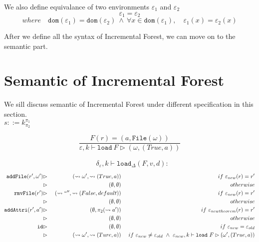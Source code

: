 \documentclass[10pt,twoside,a4paper]{article}
\theoremstyle{theorem}
\theoremstyle{lemma}
\theoremstyle{property}
\theoremstyle{definition}
\theoremstyle{assumption}
\def\snd{\pi_2}
\begin{document}
We also define equivalance of two environments $\varepsilon_1$ and $\varepsilon_2$
\begin{displaymath}
	\varepsilon_1 = \varepsilon_2
\end{displaymath}
\begin{displaymath}
	where \quad \mathtt{dom}(\varepsilon_1) = \mathtt{dom}(\varepsilon_2) ~\wedge~ \forall x \in \mathtt{dom}(\varepsilon_1), \quad \varepsilon_1(x) = \varepsilon_2(x)
\end{displaymath}

After we define all the syntax of Incremental Forest, we can move on to the semantic part.

\section{Semantic of Incremental Forest}

We sill discuss semantic of Incremental Forest under different specification in this section.\\

$\boxed{s ::= k^{\pi_1}_{\pi_2}}$

\begin{displaymath}
	\frac{F(r) = (a, \mathtt{File}(\omega))}
	{\varepsilon, k \vdash \mathtt{load}~F \rhd (\omega, (True, a))}
\end{displaymath}

\begin{align*}
	&\delta_\varepsilon, k \vdash \mathtt{load}_\Delta (F,v,d):
\end{align*}
\begin{align*}
	\mathtt{addFile}(r',\omega') &\rhd& ~(\leadsto \omega', \leadsto(True, a))			& &~if ~\varepsilon_{new}(r) = r' \\
								 &\rhd& ~(\emptyset,\emptyset)								& &~otherwise \\
	\mathtt{rmvFile}(r') 		 &\rhd& ~(\leadsto `` '', \leadsto(False, default))			& &~if ~\varepsilon_{new}(r) = r' \\
								 &\rhd& ~(\emptyset,\emptyset)								& &~otherwise \\
	\mathtt{addAttri}(r', a')	 &\rhd& ~(\emptyset, \snd(\leadsto a'))				& &~if ~\varepsilon_{newtheorem}(r) = r' \\
								 &\rhd& ~(\emptyset,\emptyset)								& &~otherwise	\\
	\mathtt{id}					 &\rhd& ~(\emptyset,\emptyset)								& &~ if ~\varepsilon_{new} = \varepsilon_{old}\\
								 &\rhd& ~(\leadsto \omega', \leadsto (Ture, a))				& &~ if ~\varepsilon_{new} \not= \varepsilon_{old} ~\wedge ~\varepsilon_{new}, k \vdash \mathtt{load}~F \rhd (\omega', (True, a))
\end{align*}
\end{document}
